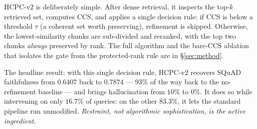 HCPC-v$2$ is deliberately simple. After dense retrieval, it inspects
the top-$k$ retrieved set, computes CCS, and applies a single decision
rule: if CCS is below a threshold $\tau$ (a coherent set worth
preserving), refinement is skipped. Otherwise, the lowest-similarity
chunks are sub-divided and reranked, with the top two chunks
\emph{always} preserved by rank. The full algorithm and the bare-CCS
ablation that isolates the gate from the protected-rank rule are in
\S\ref{sec:method}.

The headline result: with this single decision rule, HCPC-v$2$
recovers SQuAD faithfulness from $0.6407$ back to $0.7874$ --- $93\%$
of the way back to the no-refinement baseline --- and brings
hallucination from $10\%$ to $0\%$. It does so while intervening on
only $16.7\%$ of queries: on the other $83.3\%$, it lets the standard
pipeline run unmodified. \emph{Restraint, not algorithmic
sophistication, is the active ingredient.}
